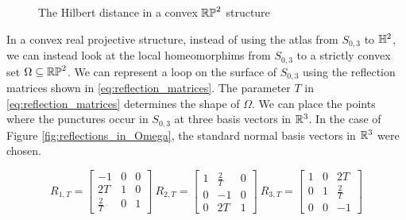 \documentclass{amsart}
\begin{document}
	\begin{figure}[h]
		\begin{center}
		\end{center}
		\caption{The Hilbert distance in a convex $\mathbb{RP}^2$ structure}
		\label{fig:hilbert_distance}
	\end{figure}
	
	In a convex real projective structure, instead of using the atlas from $S_{0,3}$ to $\mathbb{H}^2$, we can instead look at the local homeomorphims from $S_{0,3}$ to a strictly convex set $\Omega \subseteq \mathbb{RP}^2$. We can represent a loop on the surface of $S_{0,3}$ using the reflection matrices shown in \eqref{eq:reflection_matrices}. The parameter $T$ in \eqref{eq:reflection_matrices} determines the shape of $\Omega$. We can place the points where the punctures occur in $S_{0,3}$ at three basis vectors in $\mathbb{R}^3$. In the case of Figure \ref{fig:reflections_in_Omega}, the standard normal basis vectors in $\mathbb{R}^3$ were chosen.
	
	\begin{equation}
		R_{1,T} = 
		\begin{bmatrix}
			-1 & 0 & 0 \\
			2T & 1 & 0 \\
			\frac{2}{T} & 0 & 1
		\end{bmatrix}
		\ 
		R_{2,T} = 
		\begin{bmatrix}
			1 & \frac{2}{T} & 0 \\
			0 & -1 & 0 \\
			0 & 2T & 1
		\end{bmatrix}
		\ 
		R_{3,T} = 
		\begin{bmatrix}
			1 & 0 & 2T \\
			0 & 1 & \frac{2}{T} \\
			0 & 0 & -1
		\end{bmatrix}
		\label{eq:reflection_matrices}
	\end{equation}
	
\end{document}
